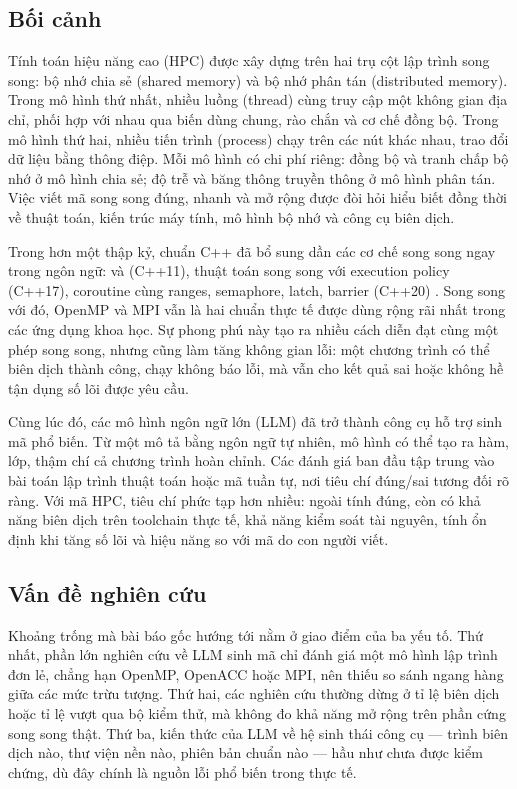 \label{sec:gioithieu}

\subsection{Bối cảnh}

Tính toán hiệu năng cao (HPC) được xây dựng trên hai trụ cột lập trình song song:
bộ nhớ chia sẻ (shared memory) và bộ nhớ phân tán (distributed memory). Trong mô
hình thứ nhất, nhiều luồng (thread) cùng truy cập một không gian địa chỉ, phối
hợp với nhau qua biến dùng chung, rào chắn và cơ chế đồng bộ. Trong mô hình thứ
hai, nhiều tiến trình (process) chạy trên các nút khác nhau, trao đổi dữ liệu
bằng thông điệp. Mỗi mô hình có chi phí riêng: đồng bộ và tranh chấp bộ nhớ ở
mô hình chia sẻ; độ trễ và băng thông truyền thông ở mô hình phân tán. Việc viết
mã song song đúng, nhanh và mở rộng được đòi hỏi hiểu biết đồng thời về thuật
toán, kiến trúc máy tính, mô hình bộ nhớ và công cụ biên dịch.

Trong hơn một thập kỷ, chuẩn C++ đã bổ sung dần các cơ chế song song ngay trong
ngôn ngữ:  và  (C++11), thuật toán song song
với execution policy (C++17), coroutine cùng ranges, semaphore, latch, barrier
(C++20) \cite{diehl2023shared,diehl2024book}. Song song với đó, OpenMP và MPI vẫn
là hai chuẩn thực tế được dùng rộng rãi nhất trong các ứng dụng khoa học. Sự
phong phú này tạo ra nhiều cách diễn đạt cùng một phép song song, nhưng cũng làm
tăng không gian lỗi: một chương trình có thể biên dịch thành công, chạy không
báo lỗi, mà vẫn cho kết quả sai hoặc không hề tận dụng số lõi được yêu cầu.

Cùng lúc đó, các mô hình ngôn ngữ lớn (LLM) đã trở thành công cụ hỗ trợ sinh mã
phổ biến. Từ một mô tả bằng ngôn ngữ tự nhiên, mô hình có thể tạo ra hàm, lớp,
thậm chí cả chương trình hoàn chỉnh. Các đánh giá ban đầu tập trung vào bài toán
lập trình thuật toán hoặc mã tuần tự, nơi tiêu chí đúng/sai tương đối rõ ràng.
Với mã HPC, tiêu chí phức tạp hơn nhiều: ngoài tính đúng, còn có khả năng biên
dịch trên toolchain thực tế, khả năng kiểm soát tài nguyên, tính ổn định khi
tăng số lõi và hiệu năng so với mã do con người viết.

\subsection{Vấn đề nghiên cứu}

Khoảng trống mà bài báo gốc \cite{diehl2026} hướng tới nằm ở giao điểm của ba yếu
tố. Thứ nhất, phần lớn nghiên cứu về LLM sinh mã chỉ đánh giá một mô hình lập
trình đơn lẻ, chẳng hạn OpenMP, OpenACC hoặc MPI, nên thiếu so sánh ngang hàng
giữa các mức trừu tượng. Thứ hai, các nghiên cứu thường dừng ở tỉ lệ biên dịch
hoặc tỉ lệ vượt qua bộ kiểm thử, mà không đo khả năng mở rộng trên phần cứng
song song thật. Thứ ba, kiến thức của LLM về hệ sinh thái công cụ — trình biên
dịch nào, thư viện nền nào, phiên bản chuẩn nào — hầu như chưa được kiểm chứng,
dù đây chính là nguồn lỗi phổ biến trong thực tế.

